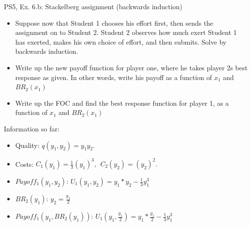 \begin{frame}{PS5, Ex. 6.b: Stackelberg assignment (backwards induction)}
    \begin{itemize}
    \item[(b)] Suppose now that Student 1 chooses his effort first, then sends the assignment on to Student 2. Student 2 observes how much exert Student 1 has exerted, makes his own choice of effort, and then submits. Solve by backwards induction.
    \end{itemize}
    \vfill\null
  \begin{multicols}{2}
    \begin{itemize}
      \item[(Step 1)] Write up the new payoff function for player one, where he takes player 2s best response as given. In other words, write his payoff as a function of \begin{math}x_1\end{math} and \begin{math}BR_2(x_1)\end{math}
      \item[(Step 2)] Write up the FOC and find the best response function for player 1, as a function of \begin{math}x_1\end{math} and \begin{math}BR_2(x_1)\end{math}
    \end{itemize}
    \vfill\null \columnbreak
    Information so far:
    \begin{itemize}
        \item[1] Quality: $q(y_1, y_2) = y_1y_2.$\\
        \item[2] Costs: $C_1(y_1) = \frac{1}{3}(y_1)^3,\ \ C_2(y_2) = (y_2)^2.$\\
        \item[3] $Payoff_1(y_1,y_2)$: $U_1(y_1,y_2) = y_1*y_2-\frac{1}{3}y_1^3$ \\
        \item[4] $BR_2(y_1)$: $y_2 = \frac{y_1}{2}$ \\
        \item[5] $Payoff_1(y_1,BR_2(y_1))$: $U_1(y_1,\frac{y_1}{2}) = y_1*\frac{y_1}{2}-\frac{1}{3}y_1^3$ \\
    \end{itemize}
    \vfill\null
  \end{multicols}
\end{frame}

